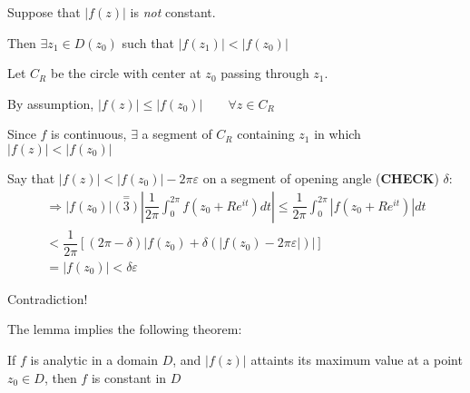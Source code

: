 \par\bigskip
\begin{prf}[]{}
  Suppose that $\left|f(z)\right|$ is \textit{not} constant.\par
  \noindent Then $\exists z_1\in D(z_0)$ such that $\left|f(z_1)\right|<\left|f(z_0)\right|$
  \par\bigskip
  \noindent Let $C_R$ be the circle with center at $z_0$ passing through $z_1$.
  \par\bigskip
  \noindent By assumption, $\left|f(z)\right|\leq \left|f(z_0)\right|\qquad\forall z\in C_R$
  \par\bigskip
  \noindent Since $f$ is continuous, $\exists$ a segment of $C_R$ containing $z_1$ in which $\left|f(z)\right|<\left|f(z_0)\right|$
  \par\bigskip
  \noindent Say that $\left|f(z)\right|<\left|f(z_0)\right|-2\pi\varepsilon$ on a segment of opening angle (\textbf{CHECK}) $\delta$:
  \begin{equation*}
    \begin{gathered}
      \Rightarrow \left|f(z_0)\right|\stackrel{=}{(3)} \left|\dfrac{1}{2\pi}\int_{0}^{2\pi}f(z_0+Re^{it})dt\right|\leq \dfrac{1}{2\pi}\int_{0}^{2\pi}\left|f(z_0+Re^{it})\right|dt\\
      < \dfrac{1}{2\pi}[(2\pi-\delta)\left|f(z_0)+\delta(\left|f(z_0)-2\pi\varepsilon\right|)\right|]\\
      = \left|f(z_0)\right| < \delta\varepsilon
    \end{gathered}
  \end{equation*}
  \par\bigskip
  \noindent Contradiction!
\end{prf}
\par\bigskip
\noindent The lemma implies the following theorem:
\par\bigskip
\begin{theo}{}
  If $f$ is analytic in a domain $D$, and $\left|f(z)\right|$ attaints its maximum value at a point $z_0\in D$, then $f$ is constant in $D$
\end{theo}
\par\bigskip
